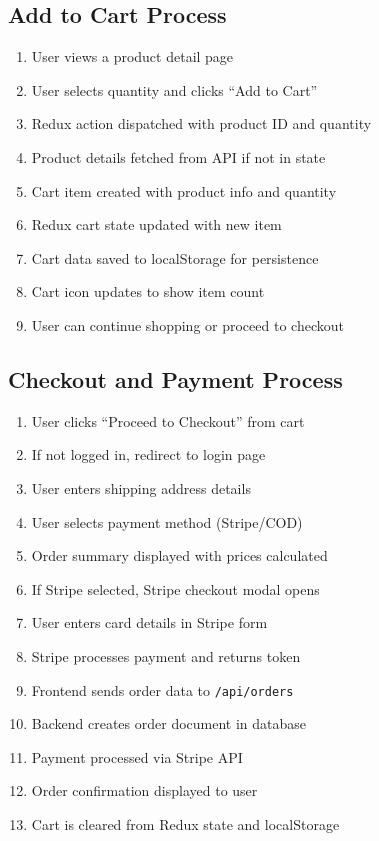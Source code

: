 \documentclass[12pt,a4paper]{article}
\begin{document}
\subsection{Add to Cart Process}

\begin{enumerate}[label=\textbf{Step \arabic*:}]
    \item User views a product detail page
    \item User selects quantity and clicks ``Add to Cart''
    \item Redux action dispatched with product ID and quantity
    \item Product details fetched from API if not in state
    \item Cart item created with product info and quantity
    \item Redux cart state updated with new item
    \item Cart data saved to localStorage for persistence
    \item Cart icon updates to show item count
    \item User can continue shopping or proceed to checkout
\end{enumerate}

\subsection{Checkout and Payment Process}

\begin{enumerate}[label=\textbf{Step \arabic*:}]
    \item User clicks ``Proceed to Checkout'' from cart
    \item If not logged in, redirect to login page
    \item User enters shipping address details
    \item User selects payment method (Stripe/COD)
    \item Order summary displayed with prices calculated
    \item If Stripe selected, Stripe checkout modal opens
    \item User enters card details in Stripe form
    \item Stripe processes payment and returns token
    \item Frontend sends order data to \texttt{/api/orders}
    \item Backend creates order document in database
    \item Payment processed via Stripe API
    \item Order confirmation displayed to user
    \item Cart is cleared from Redux state and localStorage
\end{enumerate}
\end{document}
